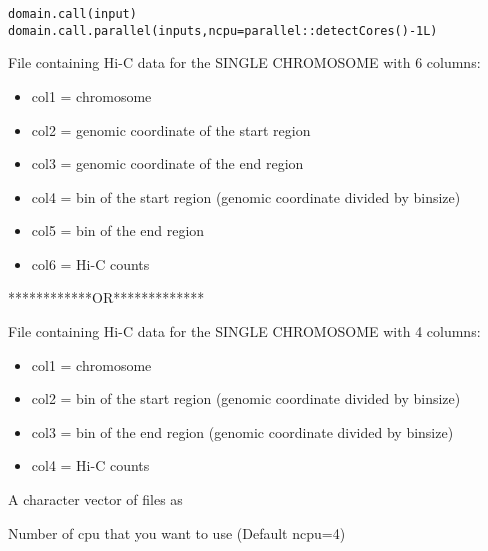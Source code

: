 \documentclass[letterpaper]{book}
\begin{document}
%
\begin{Usage}
\begin{verbatim}
domain.call(input)
domain.call.parallel(inputs,ncpu=parallel::detectCores()-1L)
\end{verbatim}
\end{Usage}
%
\begin{Arguments}
\begin{ldescription}
\item[\code{input}] 
File containing Hi-C data for the SINGLE CHROMOSOME with 6 columns:
\begin{itemize}

\item{} col1 = chromosome
\item{} col2 = genomic coordinate of the start region
\item{} col3 = genomic coordinate of the end region
\item{} col4 = bin of the start region (genomic coordinate divided by binsize)
\item{} col5 = bin of the end region
\item{} col6 = Hi-C counts

\end{itemize}

************OR*************

File containing Hi-C data for the SINGLE CHROMOSOME with 4 columns:
\begin{itemize}

\item{} col1 = chromosome
\item{} col2 = bin of the start region (genomic coordinate divided by binsize)
\item{} col3 = bin of the end region (genomic coordinate divided by binsize)
\item{} col4 = Hi-C counts

\end{itemize}


\item[\code{inputs}] 
A character vector of files as 

\item[\code{ncpu}] 
Number of cpu that you want to use (Default ncpu=4)


\end{ldescription}
\end{Arguments}
%
\end{document}

